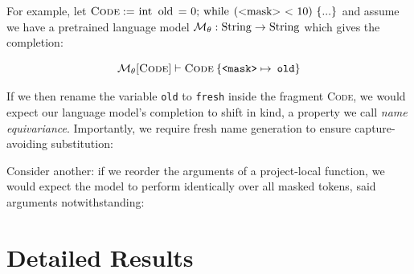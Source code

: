 \documentclass[usenames,dvipsnames]{article} %
\begin{document}
  For example, let $\textsc{Code} := \lstinline|int old = 0; while (<mask> < 10) {...}|$ and assume we have a pretrained language model $\mathcal{M}_\theta: \lstinline|String|\rightarrow\lstinline|String|$ which gives the completion:

  \begin{equation}
    \mathcal{M}_\theta[\textsc{Code}] \vdash \textsc{Code}\:\{\texttt{<mask>} \mapsto \:\texttt{old}\}
  \end{equation}

  If we then rename the variable \texttt{old} to \texttt{fresh} inside the fragment \textsc{Code}, we would expect our language model's completion to shift in kind, a property we call \textit{name equivariance}. Importantly, we require fresh name generation to ensure capture-avoiding substitution:

  \begin{center}
    \begin{prooftree}
    \end{prooftree}
  \end{center}

  Consider another: if we reorder the arguments of a project-local function, we would expect the model to perform identically over all masked tokens, said arguments notwithstanding:

  \begin{center}
    \begin{prooftree}
    \end{prooftree}
  \end{center}

  \pagebreak\section{Detailed Results}\label{sec:detailed_results}
\end{document}
